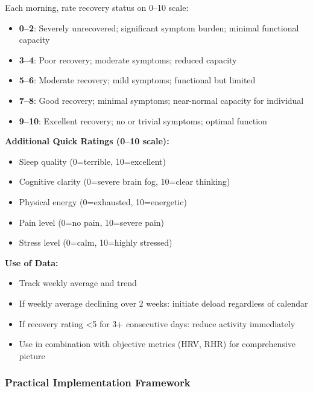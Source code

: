 \begin{protocol}
\label{prot:daily-recovery-rating}

Each morning, rate recovery status on 0--10 scale:
\begin{itemize}
    \item \textbf{0--2}: Severely unrecovered; significant symptom burden; minimal functional capacity
    \item \textbf{3--4}: Poor recovery; moderate symptoms; reduced capacity
    \item \textbf{5--6}: Moderate recovery; mild symptoms; functional but limited
    \item \textbf{7--8}: Good recovery; minimal symptoms; near-normal capacity for individual
    \item \textbf{9--10}: Excellent recovery; no or trivial symptoms; optimal function
\end{itemize}

\textbf{Additional Quick Ratings (0--10 scale):}
\begin{itemize}
    \item Sleep quality (0=terrible, 10=excellent)
    \item Cognitive clarity (0=severe brain fog, 10=clear thinking)
    \item Physical energy (0=exhausted, 10=energetic)
    \item Pain level (0=no pain, 10=severe pain)
    \item Stress level (0=calm, 10=highly stressed)
\end{itemize}

\textbf{Use of Data:}
\begin{itemize}
    \item Track weekly average and trend
    \item If weekly average declining over 2 weeks: initiate deload regardless of calendar
    \item If recovery rating <5 for 3+ consecutive days: reduce activity immediately
    \item Use in combination with objective metrics (HRV, RHR) for comprehensive picture
\end{itemize}
\end{protocol}

\subsubsection{Practical Implementation Framework}

